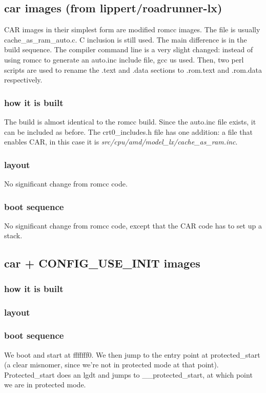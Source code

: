 \documentclass[titlepage,12pt]{article}
\begin{document}
\subsection{car images (from lippert/roadrunner-lx)}
CAR images in their simplest form are modified romcc images. The file is usually cache\_as\_ram\_auto.c. C inclusion is still used. The main difference is in the build sequence. The compiler command line is a very slight changed: instead of using romcc to generate an auto.inc include file, gcc us used. Then, two perl scripts are used to rename the .text and .data sections to .rom.text and .rom.data respectively. 
\subsubsection{how it is built}
The build is almost identical to the romcc build. Since the auto.inc file exists, it can be included as before. The crt0\_includes.h file has one addition: a file that enables CAR, in this case it is \textit{src/cpu/amd/model\_lx/cache\_as\_ram.inc}. 
\subsubsection{layout}
No significant change from romcc code. 
\subsubsection{boot sequence}
No significant change from romcc code, except that the CAR code has to set up a stack. 

\subsection{car + CONFIG\_USE\_INIT images}
\subsubsection{how it is built}
\subsubsection{layout}
\subsubsection{boot sequence}
We boot and start at fffffff0. We then jump to the entry point at protected\_start (a clear misnomer, since we're not in protected mode at that 
point). Protected\_start does an lgdt and jumps to \_\_protected\_start, at which point we are in protected mode. 
\end{document}
